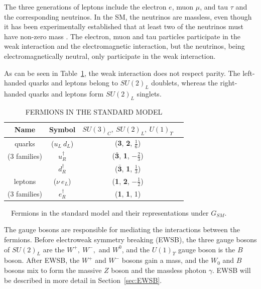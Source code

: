 The three generations of leptons include the electron $e$, muon $\mu$, and tau $\tau$ and the corresponding neutrinos. In the SM, the neutrinos are massless, even though it has been experimentally established that at least two of the neutrinos must have non-zero mass 
\cite{PhysRevLett.81.1562,PhysRevLett.87.071301,PhysRevLett.89.011301}. 
The electron, muon and tau particles participate in the weak interaction and the electromagnetic interaction, but the neutrinos, being electromagnetically neutral, only participate in the weak interaction. 

As can be seen in Table~\ref{tab:fermions}, the weak interaction does not respect parity. The left-handed quarks and leptons belong to $SU(2)_L$ doublets, whereas the right-handed quarks and leptons form $SU(2)_L$ singlets.

\begin{table}[ht]
    \caption{FERMIONS IN THE STANDARD MODEL}
    \label{tab:fermions}
    \centering
    \begin{threeparttable}
    \begin{tabular}{|c|c|c|c|}
    \hline
    \hline
    Name  & Symbol & $SU(3)_C,~SU(2)_L,~U(1)_\Upsilon $\\
  	  \hline
           \hline    
quarks        & ($u_L~d_L$)     & (\textbf{3}, \textbf{2}, $\frac{1}{6}$) \\
(3 families) & $u_R^\dagger$ & ($\bar{\textbf{3}}$, \textbf{1}, $-\frac{2}{3}$) \\
                   & $d_R^\dagger$ & ($\bar{\textbf{3}}$, \textbf{1}, $\frac{1}{3}$) \\
                   \hline
leptons       & ($\nu~e_L$)      &  (\textbf{1}, \textbf{2}, $-\frac{1}{2}$) \\
(3 families) & $e_R^\dagger$ &  (\textbf{1}, \textbf{1}, 1) \\
           \hline
           \hline
    \end{tabular}
\begin{tablenotes}
\footnotesize
\item{~~Fermions in the standard model and their representations under $G_{SM}$.}
\end{tablenotes}
\end{threeparttable}
\end{table}
The gauge bosons are responsible for mediating the interactions between the fermions. Before electroweak symmetry breaking (EWSB), the three gauge bosons of $SU(2)_L$ are the $W^+,~W^-,$ and $W^0$, and the $U(1)_\Upsilon$ gauge boson is the $B$ boson. After EWSB, the $W^+$ and $W^-$ bosons gain a mass, and the $W_0$ and $B$ bosons mix to form the massive $Z$ boson and the massless photon $\gamma$. EWSB will be described in more detail in Section~\ref{sec:EWSB}.

